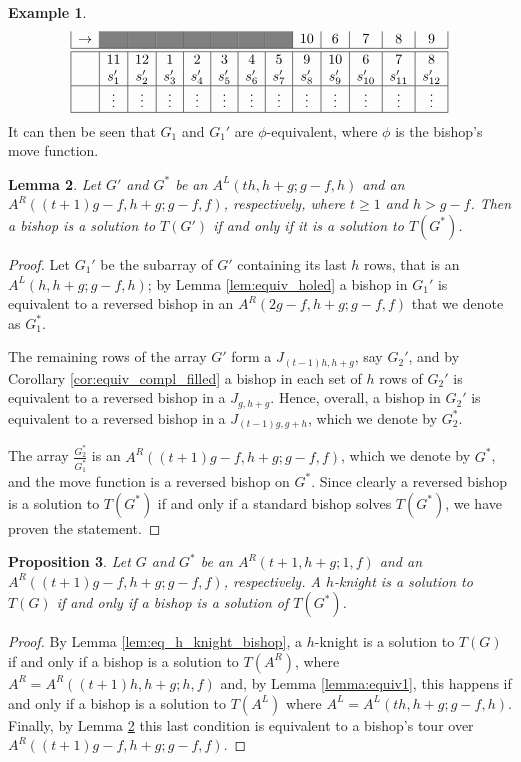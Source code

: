 \documentclass{amsart}
\newtheorem{prop}{Proposition}[section]
\newtheorem{lem}[prop]{Lemma}
\theoremstyle{definition}
\newtheorem{ex}[prop]{Example}
\numberwithin{equation}{section}
\begin{document}
\begin{ex}
\[\begin{array}{|c|c|c|c|c|c|c|c|c|c|c|c|c|}
\rightarrow&\cellcolor{gray}&\cellcolor{gray}&\cellcolor{gray}&\cellcolor{gray}&\cellcolor{gray}&\cellcolor{gray}& \cellcolor{gray}&10 &6&7&8&9 \\ \hline
\hline
&11&12&1&2&3&4&5&9&10&6&7&8\\ &s_1'&s_2'&s_3'&s_4'&s_5'&s_6'&s_7'&s_8'&s_9'&s_{10}'&s_{11}'&s_{12}' \\\hline 
  &\vdots & \vdots & \vdots & \vdots & \vdots & \vdots & \vdots & \vdots & \vdots & \vdots & \vdots & \vdots   \\ \hline
\end{array}
\]
It can then be seen that $G_1$ and $G_1'$ are $\phi$-equivalent, where $\phi$ is the bishop's move function.
\end{ex}


\begin{lem}\label{lem:equivalenza2}
Let $G'$ and $G^*$ be an $A^L(th,h+g; g-f,h)$ and an $A^R((t+1)g-f,h+g; g-f,f)$, respectively, where $t\geq1$ and $h>g-f$. Then a bishop is a solution to $T(G')$ if and only if it is a solution to $T(G^*)$.
\end{lem}
\begin{proof}
Let $G_1'$ be the subarray of $G'$ containing its last $h$ rows, that is an $A^L(h,h+g;g-f,h)$; by Lemma \ref{lem:equiv_holed} a bishop in $G_1'$ is equivalent to a reversed bishop in an $A^R(2g-f,h+g;g-f,f)$ that we denote as $G_1^*$.


The remaining rows of the array $G'$ form a $J_{(t-1)h,h+g}$, say $G_2'$, and by Corollary \ref{cor:equiv_compl_filled} a bishop in each set of $h$ rows of $G_2'$ is equivalent to a reversed bishop in a $J_{g,h+g}$. Hence, overall, a bishop in $G_2'$ is equivalent to a reversed bishop in a $J_{(t-1)g,g+h}$, which we denote by $G_2^*$.

The array $\frac{G_2^*}{G_1^*}$ is an $A^R((t+1)g-f,h+g; g-f,f)$, which we denote by $G^*$, and the move function is a reversed bishop on $G^*$. Since clearly a reversed bishop is a solution to $T(G^*)$ if and only if a standard bishop solves $T(G^*)$, we have proven the statement.
\end{proof}

\begin{prop} \label{thm:eqv_array}
Let $G$ and $G^*$ be an $A^{R}(t+1,h+g;1,f)$ and an $A^R((t+1)g-f,h+g;g-f,f)$, respectively.
A $h$-knight is a solution to $T(G)$ if and only if a bishop is a solution of $T(G^*)$.
\end{prop}
\begin{proof}
     By Lemma \ref{lem:eq_h_knight_bishop}, a $h$-knight is a solution to $T(G)$ if and only if a bishop is a solution to $T(A^R)$, where $A^R=A^R((t+1)h,h+g;h,f)$ and, by Lemma \ref{lemma:equiv1}, this happens if and only if a bishop is a solution to $T(A^L)$ where $A^L=A^L(th,h+g;g-f,h)$. Finally, by Lemma \ref{lem:equivalenza2} this last condition is equivalent to a bishop's tour over $A^R((t+1)g-f,h+g;g-f,f)$.
\end{proof}
\end{document}
